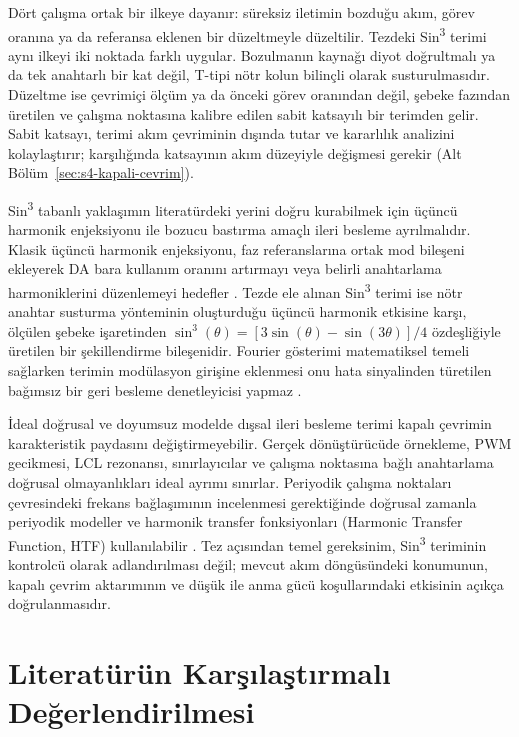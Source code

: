 Dört çalışma ortak bir ilkeye dayanır: süreksiz iletimin bozduğu akım, görev oranına ya da referansa eklenen bir düzeltmeyle düzeltilir. Tezdeki Sin\textsuperscript{3} terimi aynı ilkeyi iki noktada farklı uygular. Bozulmanın kaynağı diyot doğrultmalı ya da tek anahtarlı bir kat değil, T-tipi nötr kolun bilinçli olarak susturulmasıdır. Düzeltme ise çevrimiçi ölçüm ya da önceki görev oranından değil, şebeke fazından üretilen ve çalışma noktasına kalibre edilen sabit katsayılı bir terimden gelir. Sabit katsayı, terimi akım çevriminin dışında tutar ve kararlılık analizini kolaylaştırır; karşılığında katsayının akım düzeyiyle değişmesi gerekir (Alt Bölüm~\ref{sec:s4-kapali-cevrim}).

Sin\textsuperscript{3} tabanlı yaklaşımın literatürdeki yerini doğru kurabilmek için üçüncü harmonik enjeksiyonu ile bozucu bastırma amaçlı ileri besleme ayrılmalıdır. Klasik üçüncü harmonik enjeksiyonu, faz referanslarına ortak mod bileşeni ekleyerek DA bara kullanım oranını artırmayı veya belirli anahtarlama harmoniklerini düzenlemeyi hedefler \citep{Holmes2003,Aghdam2013}. Tezde ele alınan Sin\textsuperscript{3} terimi ise nötr anahtar susturma yönteminin oluşturduğu üçüncü harmonik etkisine karşı, ölçülen şebeke işaretinden $\sin^3(\theta)=[3\sin(\theta)-\sin(3\theta)]/4$ özdeşliğiyle üretilen bir şekillendirme bileşenidir. Fourier gösterimi matematiksel temeli sağlarken terimin modülasyon girişine eklenmesi onu hata sinyalinden türetilen bağımsız bir geri besleme denetleyicisi yapmaz \citep{Oppenheim1997}.

İdeal doğrusal ve doyumsuz modelde dışsal ileri besleme terimi kapalı çevrimin karakteristik paydasını değiştirmeyebilir. Gerçek dönüştürücüde örnekleme, PWM gecikmesi, LCL rezonansı, sınırlayıcılar ve çalışma noktasına bağlı anahtarlama doğrusal olmayanlıkları ideal ayrımı sınırlar. Periyodik çalışma noktaları çevresindeki frekans bağlaşımının incelenmesi gerektiğinde doğrusal zamanla periyodik modeller ve harmonik transfer fonksiyonları (Harmonic Transfer Function, HTF) kullanılabilir \citep{Wereley1991,Liao2022}. Tez açısından temel gereksinim, Sin\textsuperscript{3} teriminin kontrolcü olarak adlandırılması değil; mevcut akım döngüsündeki konumunun, kapalı çevrim aktarımının ve düşük ile anma gücü koşullarındaki etkisinin açıkça doğrulanmasıdır.

\section{Literatürün Karşılaştırmalı Değerlendirilmesi}

